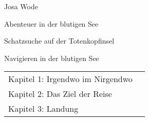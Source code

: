 \documentclass[fontsize=12pt,]{scrreprt}
\newcommand{\storytitle}{Abenteuer in der blutigen See}
\newcommand{\storysubtitle}{Schatzsuche auf der Totenkopfinsel}
\newcommand{\storyauthor}{Josa Wode}
\newcommand{\printtitle}{\begin{center}
{\large \storyauthor}

\vspace{0.6cm}
{\huge \storytitle}

\vspace{0.3cm}
{\large \storysubtitle}
\end{center}
}
\begin{document}
\thispagestyle{empty}

\printtitle
\thispagestyle{empty}

{\large

{\vspace{0.5cm}\noindent\LARGE Navigieren in der blutigen See}

\vspace{0.5cm}\noindent\begin{tabular}{lr}
Kapitel 1: Irgendwo im Nirgendwo & \pageref{0Kapitel 1: Irgendwo im Nirgendwo} \\
Kapitel 2: Das Ziel der Reise & \pageref{1Kapitel 2: Das Ziel der Reise} \\
Kapitel 3: Landung & \pageref{2Kapitel 3: Landung} \\
\end{tabular}
}

\vspace{0.5cm}



\noindent

\clearpage



\end{document}
